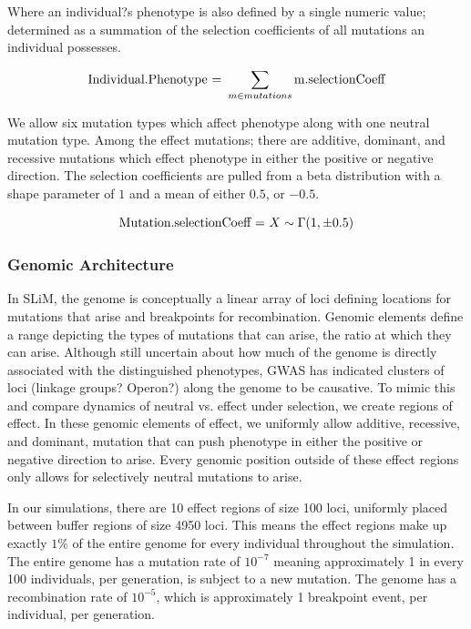 \documentclass{article}
\begin{document}
Where an individual?s phenotype is also defined by a single numeric value; 
determined as a summation of the selection coefficients of all mutations an individual possesses. 

	\[
{\textnormal{Individual.Phenotype = } \sum_{m \in mutations} \textnormal{m.selectionCoeff}}
	\]
    
    
We allow six mutation types which affect phenotype along with one neutral mutation type.
Among the effect mutations; 
there are additive, dominant, and recessive mutations which effect phenotype
in either the positive or negative direction. 
The selection coefficients are pulled from a beta distribution 
with a shape parameter of $1$ and a mean of either $0.5$, or ${-0.5}$. 

	\[
\textnormal{Mutation.selectionCoeff = } X \sim \Gamma (1,\pm0.5)
	\]


\subsubsection{Genomic Architecture}

In SLiM, the genome is conceptually a linear array of loci defining locations for 
mutations that arise and breakpoints for recombination. 
Genomic elements define a range depicting the types of mutations that can arise, the ratio at which they can arise. 
Although still uncertain about how much of the genome is directly associated with the distinguished phenotypes, 
GWAS has indicated clusters of loci (linkage groups? Operon?) along the genome to be causative. 
To mimic this and compare dynamics of neutral vs. effect under selection, 
we create regions of effect. 
In these genomic elements of effect, we uniformly allow additive, recessive, and dominant, mutation that can push phenotype in either the positive or negative direction to arise. 
Every genomic position outside of these effect regions only allows for selectively neutral mutations to arise.

In our simulations, there are 10 effect regions of size 100 loci, uniformly placed between buffer regions of size 4950 loci. 
This means the effect regions make up exactly $1\%$ of the entire genome for every individual throughout the simulation. 
The entire genome has a mutation rate of $10^{-7}$ meaning approximately 1 in every 100 individuals, per generation, is subject to a new mutation. 
The genome has a recombination rate of $10^{-5}$, which is approximately 1 breakpoint event, per individual, per generation. 
\end{document}
